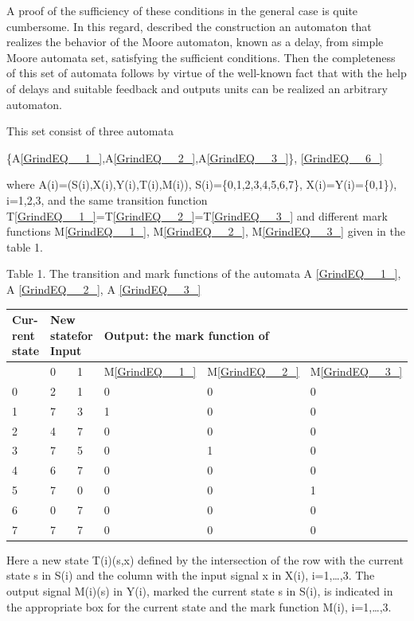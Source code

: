 \documentclass{article}
\begin{document}
A proof of the sufficiency of these conditions in the general case is quite cumbersome. In this regard, described the construction an automaton that realizes the behavior of the Moore automaton, known as a delay, from simple Moore automata set, satisfying the sufficient conditions. Then the completeness of this set of automata follows by virtue of the well-known fact that with the help of delays and suitable feedback and outputs units can be realized an arbitrary automaton.

This set consist of three automata

\{A\eqref{GrindEQ__1_},A\eqref{GrindEQ__2_},A\eqref{GrindEQ__3_}\},  \eqref{GrindEQ__6_}

where A(i)=(S(i),X(i),Y(i),T(i),M(i)), S(i)=\{0,1,2,3,4,5,6,7\}, X(i)=Y(i)=\{0,1\}), i=1,2,3, and the same transition function T\eqref{GrindEQ__1_}=T\eqref{GrindEQ__2_}=T\eqref{GrindEQ__3_} and different mark functions M\eqref{GrindEQ__1_}, M\eqref{GrindEQ__2_}, M\eqref{GrindEQ__3_} given in the table 1.

Table 1. The transition and mark functions of the automata A \eqref{GrindEQ__1_}, A \eqref{GrindEQ__2_}, A \eqref{GrindEQ__3_}

\begin{tabular}{|p{0.3in}|p{0.3in}|p{0.3in}|p{0.3in}|p{0.3in}|p{0.3in}|} \hline
Cur-rent state & \multicolumn{2}{|p{0.5in}|}{New statefor Input} & \multicolumn{3}{|p{1.0in}|}{Output: the mark function of} \\ \hline
 & 0 & 1 & M\eqref{GrindEQ__1_} & M\eqref{GrindEQ__2_} & M\eqref{GrindEQ__3_} \\ \hline
0 & 2 & 1 & 0 & 0 & 0 \\ \hline
1 & 7 & 3 & 1 & 0 & 0 \\ \hline
2 & 4 & 7 & 0 & 0 & 0 \\ \hline
3 & 7 & 5 & 0 & 1 & 0 \\ \hline
4 & 6 & 7 & 0 & 0 & 0 \\ \hline
5 & 7 & 0 & 0 & 0 & 1 \\ \hline
6 & 0 & 7 & 0 & 0 & 0 \\ \hline
7 & 7 & 7 & 0 & 0 & 0 \\ \hline
\end{tabular}

Here a new state T(i)(s,x) defined by the intersection of the row with the current state s in S(i) and the column with the input signal x in X(i), i=1,\dots ,3. The output signal M(i)(s) in Y(i), marked the current state s in S(i), is indicated in the appropriate box for the current state and the mark function M(i), i=1,\dots ,3.
\end{document}
